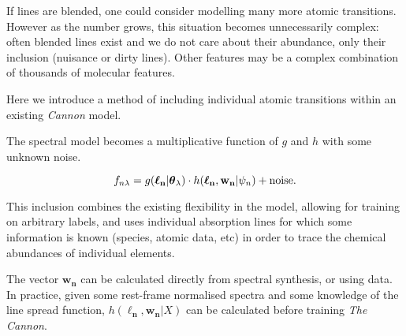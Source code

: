 \documentclass[useAMS,usenatbib]{mn2e}
\newcommand\tc{\textit{The Cannon}}
\newcommand\lv{\mathbf{\boldsymbol\ell_n}}
\newcommand\cv{{\boldsymbol\theta}_\lambda}
\newcommand\wv{\mathbf{w_n}}
\newcommand\given{|}
\begin{document}
If lines are blended, one could consider modelling many more atomic transitions.
However as the number grows, this situation becomes unnecessarily complex:
often blended lines exist and we do not care about their abundance, only their
inclusion (nuisance or dirty lines). Other features may be a complex combination
of thousands of molecular features.

Here we introduce a method of including individual atomic transitions within an existing \textit{Cannon} model.

The spectral model becomes a multiplicative function of $g$ and $h$ with some
unknown noise.

\begin{equation}
    f_{n\lambda} = g(\lv\given\cv) \cdot h(\lv,\wv\given\psi_n) +  {\rm noise}.
\end{equation}

This inclusion combines the existing flexibility in the model, allowing for training on arbitrary labels, and uses individual absorption lines for which some information is known (species, atomic data, etc) in order to trace the chemical abundances of individual elements.


The vector $\wv$ can be calculated directly from spectral synthesis, or using data.
In practice, given some rest-frame normalised spectra and some knowledge of the
line spread function, $h(\lv,\wv\given{}X)$ can be calculated before training \tc.





\end{document}

